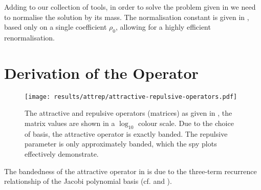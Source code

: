 



Adding to our collection of tools, in order to solve the problem given in  we need to normalise the solution by its mass.
The normalisation constant is given in , based only on a single coefficient $\rho_0$, allowing for a highly efficient renormalisation.


\pagebreak
\section{Derivation of the Operator}



\begin{figure}[H]
  \centering
  \texttt{[image: results/attrep/attractive-repulsive-operators.pdf]}
  \caption[Attractive and repulsive operators.]{The attractive and repulsive operators (matrices) as given in , the matrix values are shown in a $\log_{10}$ colour scale. Due to the choice of basis, the attractive operator is exactly banded. The repulsive parameter is only approximately banded, which the spy plots effectively demonstrate.}
  \label{fig:attractive-repulsive}
\end{figure}

The bandedness of the attractive operator in  is due to the three-term recurrence relationship of the Jacobi polynomial basis (cf.  and ).

